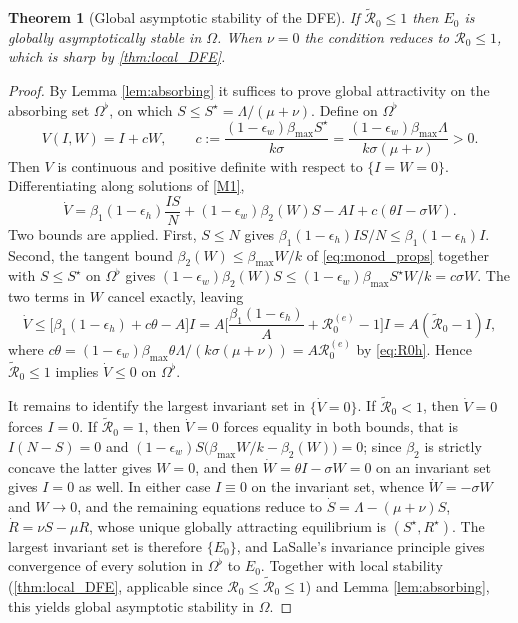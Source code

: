 \documentclass[11pt]{article}
\theoremstyle{plain}
\newtheorem{theorem}{Theorem}[section]
\theoremstyle{definition}
\theoremstyle{remark}
\newcommand{\Rz}{\mathcal{R}_0}
\newcommand{\Rze}{\mathcal{R}_0^{(e)}}
\newcommand{\Rtil}{\widetilde{\mathcal{R}}_0}
\begin{document}
\begin{theorem}[Global asymptotic stability of the DFE]\label{thm:global_DFE}
If $\Rtil\le1$ then $E_0$ is globally asymptotically stable in $\Omega$. When $\nu=0$ the condition reduces to $\Rz\le1$, which is sharp by \cref{thm:local_DFE}.
\end{theorem}

\begin{proof}
By Lemma \ref{lem:absorbing} it suffices to prove global attractivity on the absorbing set $\Omega^\flat$, on which $S\le S^\star=\Lambda/(\mu+\nu)$. Define on $\Omega^\flat$
\begin{equation}\label{eq:lyap}
V(I,W)=I+cW,\qquad c:=\frac{(1-\epsilon_w)\beta_{\max}S^\star}{k\sigma}=\frac{(1-\epsilon_w)\beta_{\max}\Lambda}{k\sigma(\mu+\nu)}>0 .
\end{equation}
Then $V$ is continuous and positive definite with respect to $\{I=W=0\}$. Differentiating along solutions of \eqref{M1},
\[
\dot V=\beta_1(1-\epsilon_h)\frac{IS}{N}+(1-\epsilon_w)\beta_2(W)S-AI+c(\theta I-\sigma W).
\]
Two bounds are applied. First, $S\le N$ gives $\beta_1(1-\epsilon_h)IS/N\le\beta_1(1-\epsilon_h)I$. Second, the tangent bound $\beta_2(W)\le\beta_{\max}W/k$ of \eqref{eq:monod_props} together with $S\le S^\star$ on $\Omega^\flat$ gives $(1-\epsilon_w)\beta_2(W)S\le(1-\epsilon_w)\beta_{\max}S^\star W/k=c\sigma W$. The two terms in $W$ cancel exactly, leaving
\[
\dot V\le\big[\beta_1(1-\epsilon_h)+c\theta-A\big]I
=A\Big[\frac{\beta_1(1-\epsilon_h)}{A}+\Rze-1\Big]I=A(\Rtil-1)I,
\]
where $c\theta=(1-\epsilon_w)\beta_{\max}\theta\Lambda/(k\sigma(\mu+\nu))=A\Rze$ by \eqref{eq:R0h}. Hence $\Rtil\le1$ implies $\dot V\le0$ on $\Omega^\flat$.

It remains to identify the largest invariant set in $\{\dot V=0\}$. If $\Rtil<1$, then $\dot V=0$ forces $I=0$. If $\Rtil=1$, then $\dot V=0$ forces equality in both bounds, that is $I(N-S)=0$ and $(1-\epsilon_w)S\big(\beta_{\max}W/k-\beta_2(W)\big)=0$; since $\beta_2$ is strictly concave the latter gives $W=0$, and then $\dot W=\theta I-\sigma W=0$ on an invariant set gives $I=0$ as well. In either case $I\equiv0$ on the invariant set, whence $\dot W=-\sigma W$ and $W\to0$, and the remaining equations reduce to $\dot S=\Lambda-(\mu+\nu)S$, $\dot R=\nu S-\mu R$, whose unique globally attracting equilibrium is $(S^\star,R^\star)$. The largest invariant set is therefore $\{E_0\}$, and LaSalle's invariance principle \cite{LaSalle1976} gives convergence of every solution in $\Omega^\flat$ to $E_0$. Together with local stability (\cref{thm:local_DFE}, applicable since $\Rz\le\Rtil\le1$) and Lemma \ref{lem:absorbing}, this yields global asymptotic stability in $\Omega$.
\end{proof}
\end{document}
